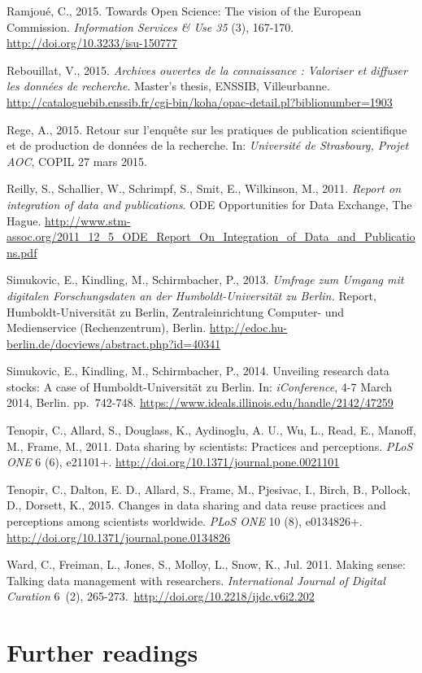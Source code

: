 \documentclass[a4paper,
fontsize=11pt,
oneside,
numbers=noperiodatend,
parskip=half-,
bibliography=totoc,
final
]{scrartcl}
\begin{document}
Ramjoué, C., 2015. Towards Open Science: The vision of the European
Commission. \emph{Information Services \& Use 35} (3), 167-170.
\url{http://doi.org/10.3233/isu-150777}

Rebouillat, V., 2015. \emph{Archives ouvertes de la connaissance :
Valoriser et diffuser les données de recherche}. Master's thesis,
ENSSIB, Villeurbanne.
\url{http://cataloguebib.enssib.fr/cgi-bin/koha/opac-detail.pl?biblionumber=1903}

Rege, A., 2015. Retour sur l'enquête sur les pratiques de publication
scientifique et de production de données de la recherche. In:
\emph{Université de Strasbourg, Projet AOC}, COPIL 27 mars 2015.

Reilly, S., Schallier, W., Schrimpf, S., Smit, E., Wilkinson, M., 2011.
\emph{Report on integration of data and publications}. ODE Opportunities
for Data Exchange, The Hague.
\url{http://www.stm-assoc.org/2011_12_5_ODE_Report_On_Integration_of_Data_and_Publications.pdf}

Simukovic, E., Kindling, M., Schirmbacher, P., 2013. \emph{Umfrage zum
Umgang mit digitalen Forschungsdaten an der Humboldt-Universität zu
Berlin.} Report, Humboldt-Universität zu Berlin, Zentraleinrichtung
Computer- und Medienservice (Rechenzentrum), Berlin.
\url{http://edoc.hu-berlin.de/docviews/abstract.php?id=40341}

Simukovic, E., Kindling, M., Schirmbacher, P., 2014. Unveiling research
data stocks: A case of Humboldt-Universität zu Berlin. In:
\emph{iConference}, 4-7 March 2014, Berlin. pp.~742-748.
\url{https://www.ideals.illinois.edu/handle/2142/47259}

Tenopir, C., Allard, S., Douglass, K., Aydinoglu, A. U., Wu, L., Read,
E., Manoff, M., Frame, M., 2011. Data sharing by scientists: Practices
and perceptions. \emph{PLoS ONE} 6 (6), e21101+.
\url{http://doi.org/10.1371/journal.pone.0021101}

Tenopir, C., Dalton, E. D., Allard, S., Frame, M., Pjesivac, I., Birch,
B., Pollock, D., Dorsett, K., 2015. Changes in data sharing and data
reuse practices and perceptions among scientists worldwide. \emph{PLoS
ONE} 10 (8), e0134826+.
\url{http://doi.org/10.1371/journal.pone.0134826}

Ward, C., Freiman, L., Jones, S., Molloy, L., Snow, K., Jul. 2011.
Making sense: Talking data management with researchers.
\emph{International Journal of Digital Curation} 6~(2),
265-273.~\url{http://doi.org/10.2218/ijdc.v6i2.202}

\section*{Further readings}\label{further-readings}
\end{document}
